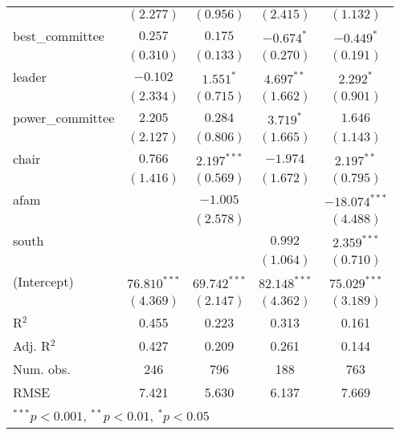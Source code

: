 \documentclass[12pt]{article}
\begin{document}
\begin{table}[H]
\begin{center}
\begin{tabular}{l c c c c }
			& $(2.277)$      & $(0.956)$      & $(2.415)$      & $(1.132)$       \\
			best\_committee        & $0.257$        & $0.175$        & $-0.674^{*}$   & $-0.449^{*}$    \\
			& $(0.310)$      & $(0.133)$      & $(0.270)$      & $(0.191)$       \\
			leader                 & $-0.102$       & $1.551^{*}$    & $4.697^{**}$   & $2.292^{*}$     \\
			& $(2.334)$      & $(0.715)$      & $(1.662)$      & $(0.901)$       \\
			power\_committee       & $2.205$        & $0.284$        & $3.719^{*}$    & $1.646$         \\
			& $(2.127)$      & $(0.806)$      & $(1.665)$      & $(1.143)$       \\
			chair                  & $0.766$        & $2.197^{***}$  & $-1.974$       & $2.197^{**}$    \\
			& $(1.416)$      & $(0.569)$      & $(1.672)$      & $(0.795)$       \\
			afam                   &                & $-1.005$       &                & $-18.074^{***}$ \\
			&                & $(2.578)$      &                & $(4.488)$       \\
			south                  &                &                & $0.992$        & $2.359^{***}$   \\
			&                &                & $(1.064)$      & $(0.710)$       \\
			(Intercept)            & $76.810^{***}$ & $69.742^{***}$ & $82.148^{***}$ & $75.029^{***}$  \\
			& $(4.369)$      & $(2.147)$      & $(4.362)$      & $(3.189)$       \\
			\hline
			R$^2$                  & 0.455          & 0.223          & 0.313          & 0.161           \\
			Adj. R$^2$             & 0.427          & 0.209          & 0.261          & 0.144           \\
			Num. obs.              & 246            & 796            & 188            & 763             \\
			RMSE                   & 7.421          & 5.630          & 6.137          & 7.669           \\
			\hline
			\multicolumn{5}{l}{\scriptsize{$^{***}p<0.001$, $^{**}p<0.01$, $^*p<0.05$}}
		\end{tabular}
	\end{center}
\end{table}
\end{document}
